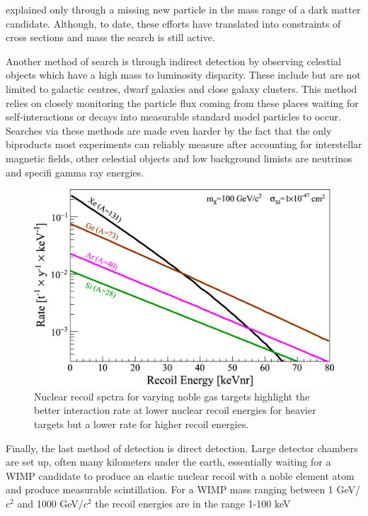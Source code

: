 \documentclass[11pt]{article} %
\begin{document}
explained only through a missing new particle in the mass range of a dark matter candidate.
Although, to date, these efforts have translated into constraints of cross sections and mass the search is still active.
\\
\par Another method of search is through indirect detection by observing celestial objects which have a high mass to luminosity disparity.
These include but are not limited to galactic centres, dwarf galaxies and close galaxy clusters.
This method relies on closely monitoring the particle flux coming from these places waiting for self-interactions or decays into measurable standard model particles to occur.
Searches via these methods are made even harder by the fact that the only biproducts most experiments can reliably measure after accounting
for interstellar magnetic fields, other celestial objects and low background limists are neutrinos and specifi gamma ray energies.
\\
\begin{figure}[H]
\centering
\includegraphics[scale=1]{images/recoil_spectra.jpg}
\caption{\cite{Schumann_2019} Nuclear recoil spctra for varying noble gas targets highlight the better interaction
rate at lower nuclear recoil energies for heavier targets but a lower rate for higher recoil energies.}
\label{fig:recoil_spectra}
\end{figure}
\par Finally, the last method of detection is direct detection.
Large detector chambers are set up, often many kilometers under the earth, essentially waiting for a WIMP
candidate to produce an elastic nuclear recoil with a noble element atom and produce measurable scintillation.
For a WIMP mass ranging between 1 GeV/$c^2$ and 1000 GeV/$c^2$ the recoil energies are in the range 1-100 keV
\end{document}
